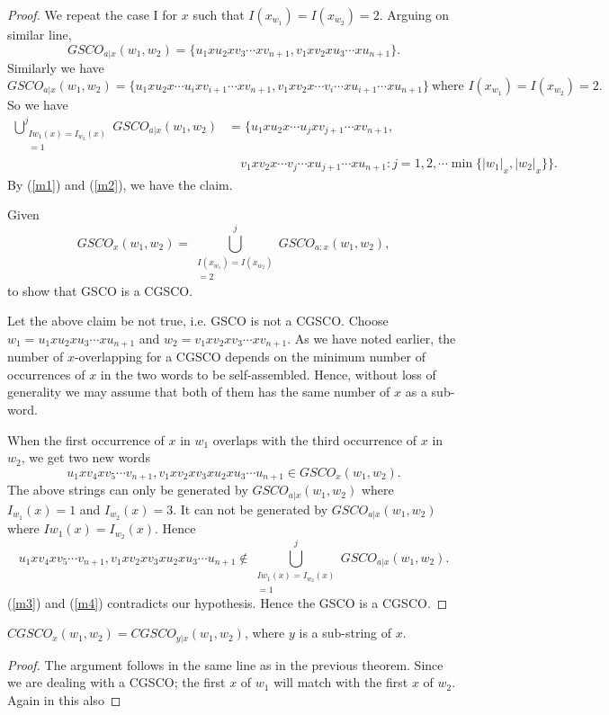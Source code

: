 \documentclass{llncs}
\begin{document}
\begin{proof}
\par We repeat the case I for $x$ such that $I(x_{w_1})=I(x_{w_2})=2$. Arguing on similar line,
\[GSCO_{a|x}(w_1,w_2)=\{u_1xu_2xv_3\cdots xv_{n+1},v_1xv_2xu_3\cdots xu_{n+1}\}.\]
Similarly we have
\[GSCO_{a|x}(w_1,w_2)=\{u_1xu_2x\cdots u_ixv_{i+1}\cdots xv_{n+1},v_1xv_2x\cdots v_i\cdots xu_{i+1}\cdots xu_{n+1}\}~\mbox{where~}I(x_{w_1})=I(x_{w_2})=2.\]
So we have
\begin{equation}\label{m2}
\begin{split}
\bigcup_{\substack{I{w_1}(x)=I_{w_2}(x)\\=1}}^jGSCO_{a|x}(w_1,w_2) & =\{u_1xu_2x\cdots u_jxv_{j+1}\cdots xv_{n+1},\\
    & \quad v_1xv_2x\cdots v_j\cdots xu_{j+1}\cdots xu_{n+1}: j=1,2,\cdots \min\{|w_1|_x,|w_2|_x\}\}.
\end{split}
\end{equation}
By (\ref{m1}) and (\ref{m2}), we have the claim.\\
\par Given
\[GSCO_x(w_1,w_2)=\bigcup_{\substack{I(x_{w_1})=I(x_{w_2})\\=2}}^jGSCO_{a:x}(w_1,w_2),\]
to show that GSCO is a CGSCO.\\
\par Let the above claim be not true, i.e. GSCO is not a CGSCO. Choose $w_1=u_1xu_2xu_3\cdots xu_{n+1}$ and $w_2=v_1xv_2xv_3\cdots xv_{n+1}$. As we have noted earlier, the number of $x$-overlapping for a CGSCO  depends on the minimum number of occurrences of $x$ in the two words to be self-assembled. Hence, without loss of generality we may assume that both of them has the same number of $x$ as a sub-word.
\par When the first occurrence of $x$ in $w_1$ overlaps with the third occurrence of $x$ in $w_2$, we get two new words
\begin{equation}\label{m3}
u_1xv_4xv_5\cdots v_{n+1},v_1xv_2xv_3xu_2xu_3\cdots u_{n+1}\in
GSCO_x(w_1,w_2).
\end{equation}
The above strings can only be generated by $GSCO_{a|x}(w_1,w_2)$
where $I_{w_1}(x)=1$ and $I_{w_2}(x)=3$. It can not be generated by
$GSCO_{a|x}(w_1,w_2)$  where $I{w_1}(x)=I_{w_2}(x)$. Hence
\begin{equation}\label{m4}
u_1xv_4xv_5\cdots v_{n+1},v_1xv_2xv_3xu_2xu_3\cdots u_{n+1}\notin
\bigcup_{\substack{I{w_1}(x)=I_{w_2}(x)\\=1}}^jGSCO_{a|x}(w_1,w_2).
\end{equation}
(\ref{m3}) and (\ref{m4}) contradicts our hypothesis. Hence the GSCO
is a CGSCO.
\end{proof}
\begin{corollary}
$CGSCO_x(w_1,w_2)=CGSCO_{y|x}(w_1,w_2)$, where $y$ is  a sub-string
of $x$.
\end{corollary}
\begin{proof}
The argument follows in the same line as in the previous theorem.
Since we are dealing with a CGSCO; the first $x$ of $w_1$ will match
with the first $x$ of $w_2$. Again in this also
\end{proof}
\end{document}
